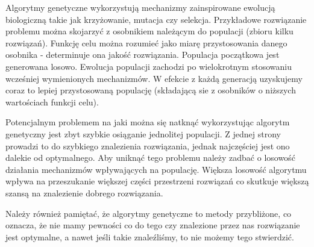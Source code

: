 \documentclass[12pt]{article}
\begin{document}
Algorytmy genetyczne wykorzystują mechanizmy zainspirowane ewolucją biologiczną takie jak krzyżowanie, mutacja czy selekcja. Przykładowe rozwiązanie problemu można skojarzyć z osobnikiem należącym do populacji (zbioru kilku rozwiązań). Funkcję celu można rozumieć jako miarę przystosowania danego osobnika - determinuje ona jakość rozwiązania. Populacja początkowa jest generowana losowo. Ewolucja populacji zachodzi po wielokrotnym stosowaniu wcześniej wymienionych mechanizmów. W efekcie z każdą generacją uzyskujemy coraz to lepiej przystosowaną populację (składającą sie z osobników o niższych wartościach funkcji celu).

Potencjalnym problemem na jaki można się natknąć wykorzystując algorytm genetyczny jest zbyt szybkie osiąganie jednolitej populacji. Z jednej strony prowadzi to do szybkiego znalezienia rozwiązania, jednak najczęściej jest ono dalekie od optymalnego. Aby uniknąć tego problemu należy zadbać o losowość działania mechanizmów wpływających na populację. Większa losowość algorytmu wpływa na przeszukanie większej części przestrzeni rozwiązań co skutkuje większą szansą na znalezienie dobrego rozwiązania.

Należy również pamiętać, że algorytmy genetyczne to metody przybliżone, co oznacza, że nie mamy pewności co do tego czy znalezione przez nas rozwiązanie jest optymalne, a nawet jeśli takie znaleźliśmy, to nie możemy tego stwierdzić. 
\end{document}

